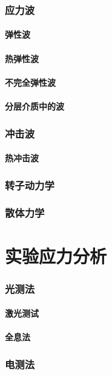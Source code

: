 \documentclass[UTF8]{../../06-Physics}
\begin{document}
    \subsection{应力波}
        \subsubsection{弹性波}
        \subsubsection{热弹性波}
        \subsubsection{不完全弹性波}
        \subsubsection{分层介质中的波}
    \subsection{冲击波}
        \subsubsection{热冲击波}
    \subsection{转子动力学}
    \subsection{散体力学}




\chapter{实验应力分析}
    \subsection{光测法}
        \subsubsection{激光测试}
        \subsubsection{全息法}
    \subsection{电测法}
\end{document}
